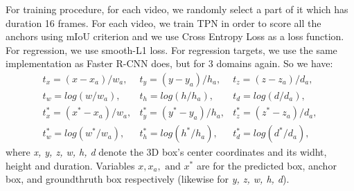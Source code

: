 \documentclass{report}
\begin{document}
For training procedure, for each video, we randomly select a part of it which has duration 16 frames. For each video, we train TPN in
order to score all the anchors using mIoU criterion and we use Cross Entropy Loss as a loss function. For regression,
we use smooth-L1 loss. For regression targets, we use the same implementation as Faster R-CNN does, but for 3 domains again. So we have:
\[ \begin{matrix}
    t_x = (x-x_a)/w_a, & t_y = (y-y_a)/h_a, & t_z= (z-z_a)/d_a, \\
    t_w= log(w/w_a), & t_h= log(h/h_a), & t_d = log(d/d_a), \\
    t^*_x = (x^* - x_a)/w_a, & t^*_y = (y^* - y_a)/h_a, & t^*_z = (z^* - z_a)/d_a, \\
    t^*_w = log(w^* /w_a), & t^*_h = log(h^*/h_a), & t^*_d = log(d^*/d_a),
  \end{matrix}
\]
where \textit{x, y, z, w, h, d} denote the 3D box's center coordinates and its widht, height and duration. Variables $x, x_a, \text{ and } x^*$
are for the predicted box, anchor box, and groundthruth box respectively (likewise for \textit{y, z, w, h, d}). \par
\end{document}
